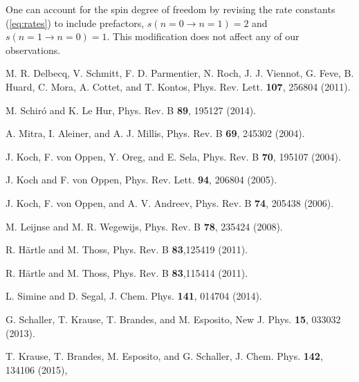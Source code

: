 \documentclass[aps,pra,twocolumn,groupedaddress,showpacs,superscriptaddress,amssymb,amsmath]{revtex4-1}
\begin{document}
\begin{thebibliography}{0}
One can account for the spin degree of freedom
by revising the rate constants (\ref{eq:rates}) to include prefactors, 
$s(n=0\to n=1)=2$ and $s(n=1\to n=0)=1$.
This modification does not affect any of our observations.

M. R. Delbecq, V. Schmitt, F. D. Parmentier, N. Roch, J. J.
Viennot, G. Feve, B. Huard, C. Mora, A. Cottet, and T. Kontos,
Phys. Rev. Lett. {\bf 107}, 256804 (2011).

M. Schir\'o and K. Le Hur, Phys. Rev. B {\bf 89}, 195127 (2014).

A. Mitra, I. Aleiner, and A. J. Millis,
Phys. Rev. B {\bf 69}, 245302 (2004).  

J.  Koch,  F.  von  Oppen,  Y.  Oreg,  and  E.  Sela,
Phys.  Rev.  B {\bf 70},  195107 (2004).

 J. Koch and F. von Oppen, 
Phys. Rev. Lett. {\bf 94}, 206804 (2005).

J. Koch, F. von Oppen, and A. V. Andreev, 
Phys. Rev. B {\bf 74}, 205438 (2006).

M. Leijnse and M. R. Wegewijs,
Phys. Rev. B {\bf 78}, 235424 (2008).

R. H\"artle and M. Thoss, 
Phys. Rev. B {\bf 83},125419 (2011).

R. H\"artle and M. Thoss, Phys. Rev. B {\bf 83},115414 (2011).



L. Simine and D. Segal,
J. Chem. Phys. {\bf 141}, 014704 (2014).

G. Schaller, T. Krause, T. Brandes, and M. Esposito,
New J. Phys. {\bf 15}, 033032 (2013).

T. Krause, T. Brandes, M. Esposito, and G. Schaller,
J. Chem. Phys. {\bf 142}, 134106 (2015),


\end{thebibliography}
\end{document}
